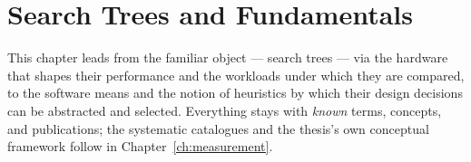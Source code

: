 \chapter{Search Trees and Fundamentals}\label{ch:foundations}


This chapter leads from the familiar object --- search trees --- via the hardware that shapes their
performance and the workloads under which they are compared, to the software means and the notion of
heuristics by which their design decisions can be abstracted and selected. Everything stays with
\emph{known} terms, concepts, and publications; the systematic catalogues and the thesis's own conceptual
framework follow in Chapter~\ref{ch:measurement}.

\begin{nurlang}

\end{nurlang}
